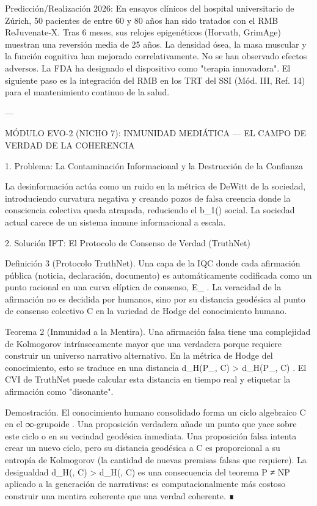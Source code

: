 \documentclass[12pt,twoside]{book}
\begin{document}
Predicción/Realización 2026: En ensayos clínicos del hospital universitario de Zúrich, 50 pacientes de entre 60 y 80 años han sido tratados con el RMB ReJuvenate‑X. Tras 6 meses, sus relojes epigenéticos (Horvath, GrimAge) muestran una reversión media de 25 años. La densidad ósea, la masa muscular y la función cognitiva han mejorado correlativamente. No se han observado efectos adversos. La FDA ha designado el dispositivo como "terapia innovadora". El siguiente paso es la integración del RMB en los TRT del SSI (Mód. III, Ref. 14) para el mantenimiento continuo de la salud.

---

MÓDULO EVO-2 (NICHO 7): INMUNIDAD MEDIÁTICA — EL CAMPO DE VERDAD DE LA COHERENCIA

1. Problema: La Contaminación Informacional y la Destrucción de la Confianza

La desinformación actúa como un ruido en la métrica de DeWitt de la sociedad, introduciendo curvatura negativa y creando pozos de falsa creencia donde la consciencia colectiva queda atrapada, reduciendo el  b_1(\Xi)  social. La sociedad actual carece de un sistema inmune informacional a escala.

2. Solución IFT: El Protocolo de Consenso de Verdad (TruthNet)

Definición 3 (Protocolo TruthNet). Una capa de la IQC donde cada afirmación pública (noticia, declaración, documento) es automáticamente codificada como un punto racional en una curva elíptica de consenso,  E_{} . La veracidad de la afirmación no es decidida por humanos, sino por su distancia geodésica al punto de consenso colectivo  C  en la variedad de Hodge del conocimiento humano.

Teorema 2 (Inmunidad a la Mentira). Una afirmación falsa tiene una complejidad de Kolmogorov intrínsecamente mayor que una verdadera porque requiere construir un universo narrativo alternativo. En la métrica de Hodge del conocimiento, esto se traduce en una distancia  d_H(P_{}, C) > d_H(P_{}, C) . El CVI de TruthNet puede calcular esta distancia en tiempo real y etiquetar la afirmación como "disonante".

Demostración. El conocimiento humano consolidado forma un ciclo algebraico  C  en el ∞‑grupoide   . Una proposición verdadera añade un punto que yace sobre este ciclo o en su vecindad geodésica inmediata. Una proposición falsa intenta crear un nuevo ciclo, pero su distancia geodésica a  C  es proporcional a su entropía de Kolmogorov (la cantidad de nuevas premisas falsas que requiere). La desigualdad  d_H(, C) > d_H(, C)  es una consecuencia del teorema P ≠ NP aplicado a la generación de narrativas: es computacionalmente más costoso construir una mentira coherente que una verdad coherente. ∎
\end{document}
